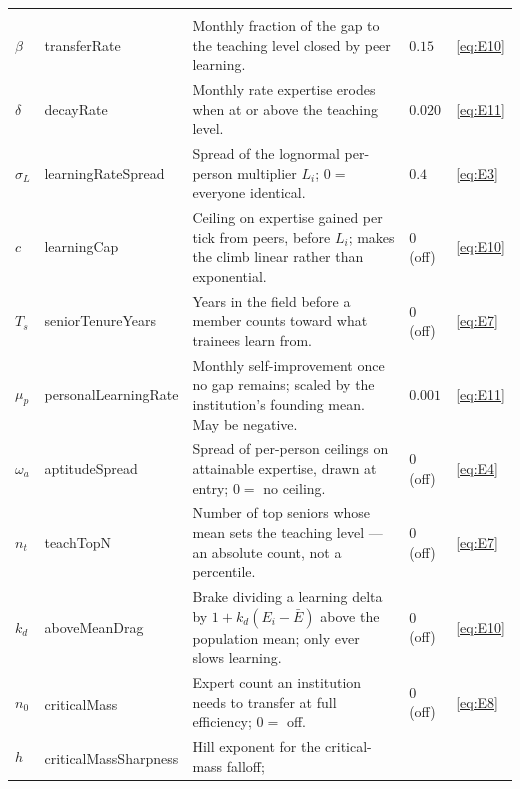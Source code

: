 \documentclass[11pt]{article}
\newcommand{\eqn}[1]{\eqref{eq:#1}}
\newcommand{\dg}{\textsuperscript{\dag}}
\begin{document}
\begin{longtable}{L{1.6cm} K{2.9cm} L{6.8cm} S{2.5cm} S{2.0cm}}
\addlinespace
{}\\[2pt]
$\beta$ & transferRate & Monthly fraction of the gap to the teaching level closed
  by peer learning.
  & $0.15$ & \eqn{E10} \\
$\delta$ & decayRate & Monthly rate expertise erodes when at or above the
  teaching level.
  & $0.020$ & \eqn{E11} \\
$\sigma_L$ & learningRateSpread & Spread of the lognormal per-person multiplier
  $L_i$; $0 = $ everyone identical.
  & $0.4$ & \eqn{E3} \\
$c$ & learningCap & Ceiling on expertise gained per tick from peers, before
  $L_i$; makes the climb linear rather than exponential.
  & $0$ (off) & \eqn{E10} \\
$T_s$ & seniorTenureYears & Years in the field before a member counts toward what
  trainees learn from.
  & $0$ (off) & \eqn{E7} \\
$\mu_p$ & personalLearningRate & Monthly self-improvement once no gap remains;
  scaled by the institution's founding mean. May be negative.
  & $0.001$ & \eqn{E11} \\
$\omega_a$ & aptitudeSpread & Spread of per-person ceilings on attainable
  expertise, drawn at entry; $0 = $ no ceiling.
  & $0$ (off) & \eqn{E4} \\
$n_t$ & teachTopN & Number of top seniors whose mean sets the teaching level ---
  an absolute count, not a percentile.
  & $0$ (off) & \eqn{E7} \\
$k_d$ & aboveMeanDrag & Brake dividing a learning delta by
  $1 + k_d(E_i - \bar E)$ above the population mean; only ever slows learning.
  & $0$ (off) & \eqn{E10} \\
$n_0$ & criticalMass\dg & Expert count an institution needs to transfer at full
  efficiency; $0 = $ off.
  & $0$ (off) & \eqn{E8} \\
$h$ & criticalMassSharpness\dg & Hill exponent for the critical-mass falloff;

\end{longtable}
\end{document}
